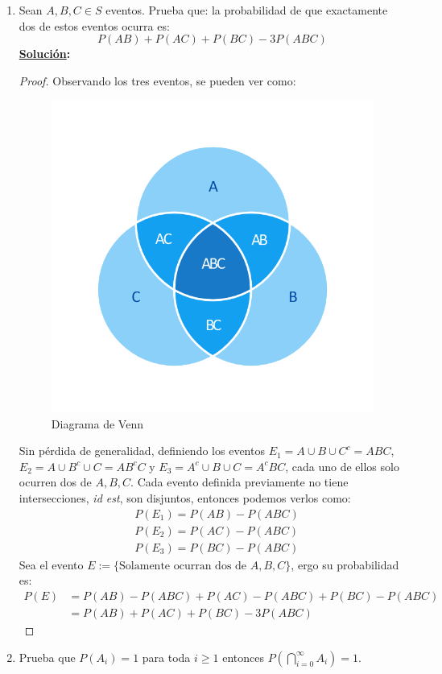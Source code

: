\documentclass[11pt,letterpaper]{report}
\newcommand{\sol}{\textbf{\underline{Solución}: }} %
\begin{document}
\begin{enumerate}
\item Sean $A,B,C \in S$ eventos. Prueba que: la probabilidad de que exactamente dos de estos
eventos ocurra es:
\[
    P(AB) + P(AC) + P(BC) - 3P(ABC)
\]
\sol
\begin{proof}
    Observando los tres eventos, se pueden ver como:
    \begin{figure}[H]
        \centering
        \includegraphics[scale=0.4]{ven.png}
        \caption{Diagrama de Venn}
    \end{figure}
    Sin pérdida de generalidad, definiendo los eventos $E_1 = A \cup B \cup C^c = ABC$,
    $E_2 = A \cup B^c \cup C = AB^cC$ y $E_3 = A^c \cup B \cup C = A^cBC$, cada uno de ellos
    solo ocurren dos de $A,B,C$. Cada evento definida previamente no tiene intersecciones,
    \textit{id est}, son disjuntos, entonces podemos verlos como:
    \begin{align*}
        &P(E_1) = P(AB) - P(ABC)\\
        &P(E_2) = P(AC) - P(ABC)\\
        &P(E_3) = P(BC) - P(ABC)
    \end{align*}
    Sea el evento $E := \{ \text{Solamente ocurran dos de $A,B,C$}\}$, ergo su probabilidad es:
    \begin{align*}
        P(E) 
            &= P(AB) - P(ABC) + P(AC) - P(ABC) + P(BC) - P(ABC)\\
            &= P(AB) + P(AC) + P(BC) - 3P(ABC)
    \end{align*}
\end{proof}
\item Prueba que $P(A_i) = 1$ para toda $i \geq 1$ entonces $P(\bigcap_{i=0}^{\infty} A_i) = 1$.


\end{enumerate}
\end{document}
